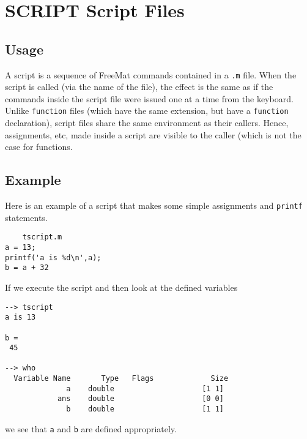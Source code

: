 \section{SCRIPT Script Files}

\subsection{Usage}

A script is a sequence of FreeMat commands contained in a
\verb|.m| file.  When the script is called (via the name of the
file), the effect is the same as if the commands inside the
script file were issued one at a time from the keyboard.
Unlike \verb|function| files (which have the same extension,
but have a \verb|function| declaration), script files share
the same environment as their callers.  Hence, assignments,
etc, made inside a script are visible to the caller (which
is not the case for functions.
\subsection{Example}

Here is an example of a script that makes some simple 
assignments and \verb|printf| statements.
\begin{verbatim}
    tscript.m
a = 13;
printf('a is %d\n',a);
b = a + 32
\end{verbatim}
If we execute the script and then look at the defined variables
\begin{verbatim}
--> tscript
a is 13

b = 
 45 

--> who
  Variable Name       Type   Flags             Size
              a    double                    [1 1]
            ans    double                    [0 0]
              b    double                    [1 1]
\end{verbatim}
we see that \verb|a| and \verb|b| are defined appropriately.
